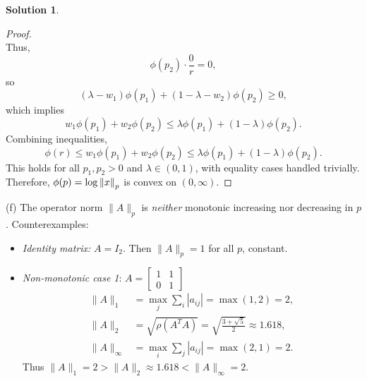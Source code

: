 \documentclass[12pt]{article}
\theoremstyle{definition}
\newtheorem*{solution}{\normalfont\textbf{Solution}}
\begin{document}
\begin{enumerate}[leftmargin=*]
\begin{solution}
\begin{proof}
\[                \]
                Thus,
                \[
                \phi(p_2) \cdot \frac{0}{r} = 0,
                \]
                so
                \[
                (\lambda - w_1) \phi(p_1) + (1-\lambda - w_2) \phi(p_2) \geq 0,
                \]
                which implies
                \[
                w_1 \phi(p_1) + w_2 \phi(p_2) \leq \lambda \phi(p_1) + (1-\lambda) \phi(p_2).
                \]
                Combining inequalities,
                \[
                \phi(r) \leq w_1 \phi(p_1) + w_2 \phi(p_2) \leq \lambda \phi(p_1) + (1-\lambda) \phi(p_2).
                \]
                This holds for all \( p_1, p_2 > 0 \) and \( \lambda \in (0,1) \), with equality cases handled trivially. Therefore, \( \phi(p) = \log \norm{x}_p \) is convex on \( (0, \infty) \).
                \end{proof}
        \item[(f)] 
            The operator norm \( \|A\|_p \) is \textit{neither} monotonic increasing nor decreasing in \( p \). Counterexamples:

            \begin{itemize}
            \item \textit{Identity matrix:} \( A = I_2 \). Then \( \|A\|_p = 1 \) for all \( p \), constant.

            \item \textit{Non-monotonic case 1}: \( A = \begin{bmatrix} 1 & 1 \\ 0 & 1 \end{bmatrix} \)
            \begin{align*}
            \|A\|_1 &= \max_{j} \sum_i |a_{ij}| = \max(1, 2) = 2, \\
            \|A\|_2 &= \sqrt{\rho(A^TA)} = \sqrt{\frac{3 + \sqrt{5}}{2}} \approx 1.618, \\
            \|A\|_\infty &= \max_i \sum_j |a_{ij}| = \max(2, 1) = 2.
            \end{align*}
            Thus \( \|A\|_1 = 2 > \|A\|_2 \approx 1.618 < \|A\|_\infty = 2 \).


\end{itemize}
\end{solution}
\end{enumerate}
\end{document}
